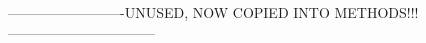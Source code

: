 






-------------------------UNUSED, NOW COPIED INTO METHODS!!!--------------------------------




\label{chap:background}


